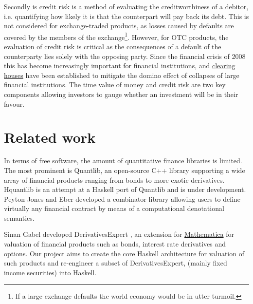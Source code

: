 Secondly is credit risk is a method of evaluating the creditworthiness of a 
debitor, i.e. quantifying how likely it is that the counterpart will pay back 
its debt. This  is not considered for exchange-traded products, as losses 
caused by defaults 
are covered by the members of the exchange\footnote{If a large exchange 
defaults the world economy would be in utter turmoil.}. However, for OTC
products, the evaluation of credit risk is critical as the consequences of a 
default of the counterparty lies solely with the opposing party. Since the 
financial crisis of 2008 this has become increasingly important for financial 
institutions, and \href{http://www.lchclearnet.com/}{clearing houses} have
been established to mitigate the 
domino effect of collapses of large financial institutions.
The time value of money and credit risk are two key components allowing 
investors to gauge whether an investment will be in their favour.\\

\section{Related work}

In terms of free software, the amount of quantitative finance libraries is 
limited.
The most prominent is Quantlib, an open-source C++ library\cite{Ame2003}
supporting a wide array of financial products ranging from bonds to more 
exotic derivatives.\\

Hquantlib\cite{hquantlib} is an attempt at a Haskell port of Quantlib
and is under 
development.\\

Peyton Jones and Eber\cite{composingcontracts} developed a combinator library 
allowing users to define virtually any financial contract by means of a
computational denotational semantics.

Sinan Gabel developed DerivativesExpert\cite{Mathematica:DerivativesExpert}
, an extension for \href{http://www.wolfram.com/mathematica/}{Mathematica}
for valuation of financial products such as bonds, interest rate derivatives 
and options. Our project aims to create the core Haskell architecture for 
valuation of such products and re-engineer a subset of DerivativesExpert, 
(mainly fixed income securities) into Haskell.
